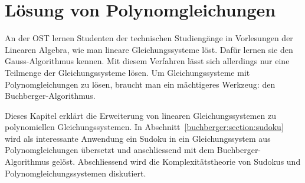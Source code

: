 %
%
%
%
\chapter{Lösung von Polynomgleichungen\label{chapter:buchberger}}
\begin{refsection}
%
%

\noindent
An der OST lernen Studenten der technischen Studiengänge in Vorlesungen der Linearen Algebra, wie man lineare Gleichungssysteme löst.
%
%
Dafür lernen sie den Gauss-Algorithmus kennen.
%
Mit diesem Verfahren lässt sich allerdings nur eine Teilmenge der Gleichungssysteme lösen.
Um Gleichungssysteme mit Polynomgleichungen zu lösen, braucht man ein mächtigeres Werkzeug: den Buchberger-Algorithmus.
%

Dieses Kapitel erklärt die Erweiterung von linearen Gleichungssystemen zu polynomiellen Gleichungssystemen.
In Abschnitt~\ref{buchberger:section:sudoku} wird als interessante Anwendung ein Sudoku in ein Gleichungssystem aus Polynomgleichungen übersetzt und anschliessend mit dem Buchberger-Algorithmus gelöst.
%
Abschliessend wird die Komplexitätstheorie von Sudokus und Polynomgleichungssystemen diskutiert.






\printbibliography[heading=subbibliography]
\end{refsection}
